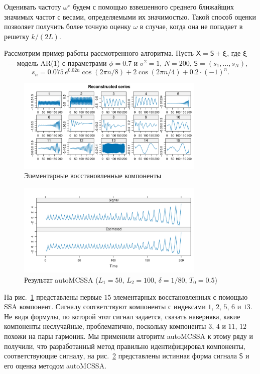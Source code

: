 \documentclass[12pt]{article}
\begin{document}
Оценивать частоту $\omega^\star$ будем с помощью взвешенного среднего ближайщих значимых частот с весами, определяемыми их значимостью. 
Такой способ оценки позволяет получить более точную оценку $\omega$ в случае, когда она не попадает в решетку $k/(2L)$.

Рассмотрим пример работы рассмотренного алгоритма. Пусть $\mathsf{X}=\mathsf{S}+\bm{\xi}$, где $\bm\xi$~--- модель AR(1) с параметрами $\phi=0.7$ и $\sigma^2=1$, $N=200$, $\mathsf{S}=(s_1,\ldots, s_N)$,
\[
s_n=0.075\, e^{0.02n}\cos(2\pi n/8) + 2\cos(2\pi n / 4) + 0.2\cdot(-1)^n.
\]

\begin{figure}[!h]
    \centering
    \includegraphics[width=0.8\textwidth]{img/reconstructed_ts.pdf}
    \caption{Элементарные восстановленные компоненты}
    \label{fig:reconstructed_ts}
\end{figure}

\begin{figure}[!h]
    \centering
    \includegraphics[width=0.8\textwidth]{img/auto_mcssa_result.pdf}
    \caption{Результат autoMCSSA ($L_1=50$, $L_2=100$, $\delta=1/80$, $T_0=0.5$)}
    \label{fig:autoMCSSA_res}
\end{figure}

На рис.~\ref{fig:reconstructed_ts} представлены первые $15$ элементарных восстановленных с помощью SSA компонент. Сигналу соответствуют компоненты с индексами $1$, $2$, $5$, $6$ и $13$. Не видя формулы, по которой этот сигнал задается, сказать наверняка, какие компоненты неслучайные, проблематично, поскольку компоненты $3$, $4$ и $11$, $12$ похожи на пары гармоник. Мы применили алгоритм autoMCSSA к этому ряду и получили, что разработанный метод правильно идентифицировал компоненты, соответствующие сигналу, на рис.~\ref{fig:autoMCSSA_res} представлены истинная форма сигнала $\mathsf{S}$ и его оценка методом autoMCSSA.
\end{document}
